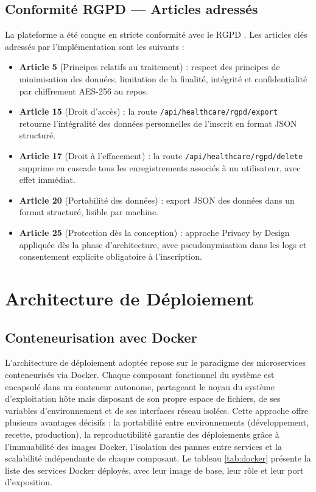 \subsection{Conformité RGPD — Articles adressés}
La plateforme a été conçue en stricte conformité avec le RGPD \cite{rgpd}. Les articles clés adressés par l'implémentation sont les suivants :
\begin{itemize}
    \item \textbf{Article 5} (Principes relatifs au traitement) : respect des principes de minimisation des données, limitation de la finalité, intégrité et confidentialité par chiffrement AES-256 au repos.
    \item \textbf{Article 15} (Droit d'accès) : la route \texttt{/api/healthcare/rgpd/export} retourne l'intégralité des données personnelles de l'inscrit en format JSON structuré.
    \item \textbf{Article 17} (Droit à l'effacement) : la route \texttt{/api/healthcare/rgpd/delete} supprime en cascade tous les enregistrements associés à un utilisateur, avec effet immédiat.
    \item \textbf{Article 20} (Portabilité des données) : export JSON des données dans un format structuré, lisible par machine.
    \item \textbf{Article 25} (Protection dès la conception) : approche Privacy by Design appliquée dès la phase d'architecture, avec pseudonymisation dans les logs et consentement explicite obligatoire à l'inscription.
\end{itemize}

\section{Architecture de Déploiement}

\subsection{Conteneurisation avec Docker}
L'architecture de déploiement adoptée repose sur le paradigme des microservices conteneurisés via Docker. Chaque composant fonctionnel du système est encapsulé dans un conteneur autonome, partageant le noyau du système d'exploitation hôte mais disposant de son propre espace de fichiers, de ses variables d'environnement et de ses interfaces réseau isolées. Cette approche offre plusieurs avantages décisifs : la portabilité entre environnements (développement, recette, production), la reproductibilité garantie des déploiements grâce à l'immuabilité des images Docker, l'isolation des pannes entre services et la scalabilité indépendante de chaque composant. Le tableau \ref{tab:docker} présente la liste des services Docker déployés, avec leur image de base, leur rôle et leur port d'exposition.

